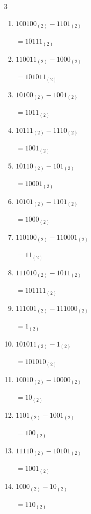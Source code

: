 \begin{multicols}{3}
\begin{enumerate}
        $=10_{(2)}$

  \item $100100_{(2)} - 1101_{(2)}$

        $=10111_{(2)}$

  \item $110011_{(2)} - 1000_{(2)}$

        $=101011_{(2)}$

  \item $10100_{(2)} - 1001_{(2)}$

        $=1011_{(2)}$

  \item $10111_{(2)} - 1110_{(2)}$

        $=1001_{(2)}$

  \item $10110_{(2)} - 101_{(2)}$

        $=10001_{(2)}$

  \item $10101_{(2)} - 1101_{(2)}$

        $=1000_{(2)}$

  \item $110100_{(2)} - 110001_{(2)}$

        $=11_{(2)}$

  \item $111010_{(2)} - 1011_{(2)}$

        $=101111_{(2)}$

\columnbreak %

  \item $111001_{(2)} - 111000_{(2)}$

        $=1_{(2)}$

  \item $101011_{(2)} - 1_{(2)}$

        $=101010_{(2)}$

  \item $10010_{(2)} - 10000_{(2)}$

        $=10_{(2)}$

  \item $1101_{(2)} - 1001_{(2)}$

        $=100_{(2)}$

  \item $11110_{(2)} - 10101_{(2)}$

        $=1001_{(2)}$

  \item $1000_{(2)} - 10_{(2)}$

        $=110_{(2)}$


\end{enumerate}
\end{multicols}
